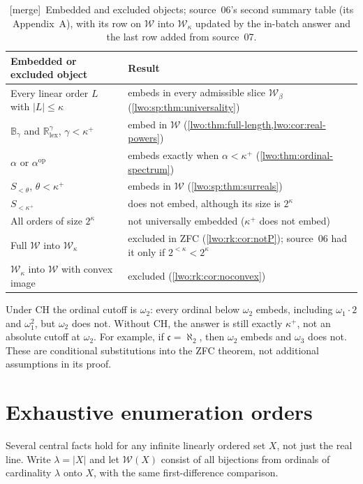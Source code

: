 \documentclass[11pt,a4paper]{article}
\theoremstyle{definition}
\theoremstyle{remark}
\newcommand{\R}{\mathbb R}
\newcommand{\W}{\mathcal W}
\newcommand{\B}{\mathbb B}
\newcommand{\lex}{\mathrm{lex}}
\newcommand{\rev}{\mathrm{op}}
\newcommand{\merge}{\textsf{[merge]}}
\begin{document}
\begin{table}[ht]
\centering\small
\renewcommand{\arraystretch}{1.15}
\begin{tabularx}{\textwidth}{@{}>{\raggedright\arraybackslash}p{}Y@{}}
\toprule
Embedded or excluded object & Result\\
\midrule
Every linear order $L$ with $|L|\leq\kappa$ & embeds in every admissible slice $\W_\beta$ (\cref{lwo:sp:thm:universality})\\
$\B_\gamma$ and $\R^\gamma_{\lex}$, $\gamma<\kappa^+$ & embed in $\W$ (\cref{lwo:thm:full-length,lwo:cor:real-powers})\\
$\alpha$ or $\alpha^{\rev}$ & embeds exactly when $\alpha<\kappa^+$ (\cref{lwo:thm:ordinal-spectrum})\\
$S_{<\theta}$, $\theta<\kappa^+$ & embeds in $\W$ (\cref{lwo:sp:thm:surreals})\\
$S_{<\kappa^+}$ & does not embed, although its size is $2^\kappa$\\
All orders of size $2^\kappa$ & not universally embedded ($\kappa^+$ does not embed)\\
Full $\W$ into $\W_\kappa$ & excluded in ZFC (\cref{lwo:rk:cor:notP}); source~06 had it only if $2^{<\kappa}<2^\kappa$\\
$\W_\kappa$ into $\W$ with convex image & excluded (\cref{lwo:rk:cor:noconvex})\\
\bottomrule
\end{tabularx}
\caption{\merge\ Embedded and excluded objects; source~06's second summary
table (its Appendix~A), with its row on $\W$ into $\W_\kappa$ updated by the
in-batch answer and the last row added from source~07.}
\label{lwo:sp:tab:objects}
\end{table}

Under CH the ordinal cutoff is $\omega_2$: every ordinal below $\omega_2$
embeds, including $\omega_1\cdot2$ and $\omega_1^2$, but $\omega_2$ does not.
Without CH, the answer is still exactly $\kappa^+$, not an absolute cutoff at
$\omega_2$. For example, if $\mathfrak c=\aleph_2$, then $\omega_2$ embeds
and $\omega_3$ does not. These are conditional substitutions into the ZFC
theorem, not additional assumptions in its proof.

\section{Exhaustive enumeration orders}\label{lwo:sec:enumerations}

Several central facts hold for any infinite linearly ordered set $X$, not
just the real line. Write $\lambda=|X|$ and let $\W(X)$ consist of all
bijections from ordinals of cardinality $\lambda$ onto $X$, with the same
first-difference comparison.
\end{document}
